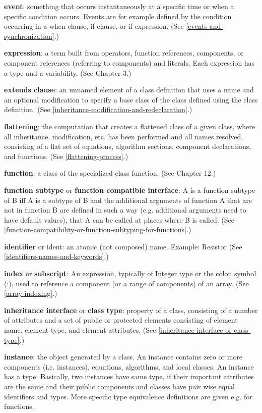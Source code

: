\documentclass[../MLS.tex]{subfiles}
\begin{document}
\textbf{event}: something that occurs instantaneously at a specific time
or when a specific condition occurs. Events are for example defined by
the condition occurring in a when clause, if clause, or if expression.
(See \autoref{events-and-synchronization}.)

\textbf{expression}: a term built from operators, function references,
components, or component references (referring to components) and
literals. Each expression has a type and a variability. (See Chapter 3.)

\textbf{extends clause}: an unnamed element of a class definition that
uses a name and an optional modification to specify a base class of the
class defined using the class definition. (See \autoref{inheritance-modification-and-redeclaration}.)

\textbf{flattening}: the computation that creates a flattened class of a
given class, where all inheritance, modification, etc. has been
performed and all names resolved, consisting of a flat set of equations,
algorithm sections, component declarations, and functions. (See \autoref{flattening-process}.)

\textbf{function}: a class of the specialized class function. (See
Chapter 12.)

\textbf{function subtype} or \textbf{function compatible interface}: A
is a function subtype of B iff A is a subtype of B and the additional
arguments of function A that are not in function B are defined in such a
way (e.g. additional arguments need to have default values), that A can
be called at places where B is called. (See \autoref{function-compatibility-or-function-subtyping-for-functions}.)

\textbf{identifier} or ident: an atomic (not composed) name. Example:
Resistor (See \autoref{identifiers-names-and-keywords}.)

\textbf{index} or \textbf{subscript}: An expression, typically of
Integer type or the colon symbol (:), used to reference a component (or
a range of components) of an array. (See \autoref{array-indexing}.)

\textbf{inheritance interface} or \textbf{class type}: property of a
class, consisting of a number of attributes and a set of public or
protected elements consisting of element name, element type, and element
attributes. (See \autoref{inheritance-interface-or-class-type}.)

\textbf{instance}: the object generated by a class. An instance contains
zero or more components (i.e. instances), equations, algorithms, and
local classes. An instance has a type. Basically, two instances have
same type, if their important attributes are the same and their public
components and classes have pair wise equal identifiers and types. More
specific type equivalence definitions are given e.g. for functions.
\end{document}
